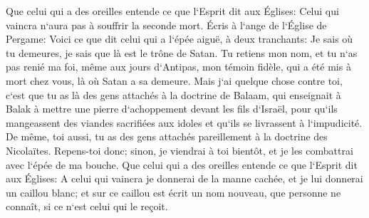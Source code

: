 \verse Que celui qui a des oreilles entende ce que l`Esprit dit aux Églises: Celui qui vaincra n`aura pas à souffrir la seconde mort. 
\verse Écris à l`ange de l`Église de Pergame: Voici ce que dit celui qui a l`épée aiguë, à deux tranchants: 
\verse Je sais où tu demeures, je sais que là est le trône de Satan. Tu retiens mon nom, et tu n`as pas renié ma foi, même aux jours d`Antipas, mon témoin fidèle, qui a été mis à mort chez vous, là où Satan a sa demeure. 
\verse Mais j`ai quelque chose contre toi, c`est que tu as là des gens attachés à la doctrine de Balaam, qui enseignait à Balak à mettre une pierre d`achoppement devant les fils d`Israël, pour qu`ils mangeassent des viandes sacrifiées aux idoles et qu`ils se livrassent à l`impudicité. 
\verse De même, toi aussi, tu as des gens attachés pareillement à la doctrine des Nicolaïtes. 
\verse Repens-toi donc; sinon, je viendrai à toi bientôt, et je les combattrai avec l`épée de ma bouche. 
\verse Que celui qui a des oreilles entende ce que l`Esprit dit aux Églises: A celui qui vaincra je donnerai de la manne cachée, et je lui donnerai un caillou blanc; et sur ce caillou est écrit un nom nouveau, que personne ne connaît, si ce n`est celui qui le reçoit. 
